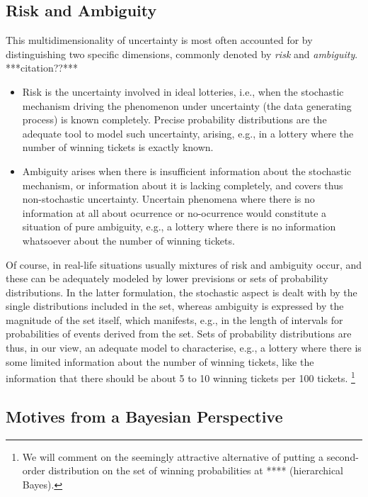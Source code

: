 \subsection{Risk and Ambiguity}
\label{sec:motivation-riskambiguity}

This multidimensionality of uncertainty is most often accounted for
by distinguishing two specific dimensions,
commonly denoted by \emph{risk} and \emph{ambiguity}. ***citation??***
\begin{itemize}
\item Risk is the uncertainty involved in ideal lotteries,
i.e., when the stochastic mechanism driving the phenomenon under uncertainty
(the data generating process) is known completely.
Precise probability distributions are the adequate tool to model such uncertainty,
arising, e.g., in a lottery where the number of winning tickets is exactly known.
\item Ambiguity arises when there is insufficient information about the stochastic mechanism,
or information about it is lacking completely, and covers thus non-stochastic uncertainty.
Uncertain phenomena where there is no information at all
about ocurrence or no-ocurrence would constitute a situation of pure ambiguity,
e.g., a lottery where there is no information whatsoever about the number of winning tickets.
\end{itemize}

Of course, in real-life situations usually mixtures of risk and ambiguity occur,
and these can be adequately modeled by lower previsions or sets of probability distributions.
In the latter formulation,
the stochastic aspect is dealt with by the single distributions included in the set,
whereas ambiguity is expressed by the magnitude of the set itself,
which manifests, e.g., in the length of intervals for probabilities of events derived from the set.
Sets of probability distributions are thus, in our view,
an adequate model to characterise, e.g.,
a lottery where there is some limited information about the number of winning tickets,
like the information that there should be about 5 to 10 winning tickets per 100 tickets.%
\footnote{We will comment on the seemingly attractive alternative
of putting a second-order distribution on the set of winning probabilities %
at **** (hierarchical Bayes).}


\subsection{Motives from a Bayesian Perspective}
\label{sec:motivation:bayesian}

